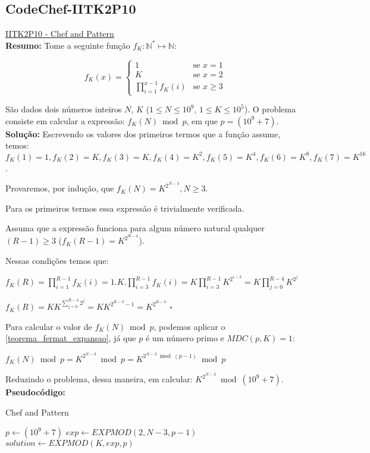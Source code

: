 \subsection{CodeChef-IITK2P10}
\href{https://www.codechef.com/problems/IITK2P10}{IITK2P10 - Chef and Pattern}\\


\textbf{Resumo:}
Tome a seguinte função $f_K:\mathbb{N}^* \longmapsto \mathbb{N}$:

\[
 f_K(x) = 
  \begin{cases} 
   1 & \text{se } x = 1 \\
   K & \text{se } x = 2 \\
   \prod_{i=1}^{x-1}f_K(i) & \text{se } x \geq 3
  \end{cases}
\]

São dados dois números inteiros $N$, $K$ ($1 \leq N \leq 10^9$, $1 \leq K \leq 10^5$). O problema consiste em calcular a expressão: $f_K(N) \bmod p$, em que $p = (10^9+7)$.
\\

\textbf{Solução:}
Escrevendo os valores dos primeiros termos que a função assume, temos: $f_K(1)=1, f_K(2)=K, f_K(3)=K, f_K(4)=K^2, f_K(5)=K^4, f_K(6)=K^8, f_K(7)=K^{16}$.

Provaremos, por indução, que $f_K(N) = K^{2^{N-3}}, N \geq 3$.

Para os primeiros termos essa expressão é trivialmente verificada.

Assuma que a expressão funciona para algum número natural qualquer $(R-1) \geq 3$ ($f_K(R-1) = K^{2^{R-4}}$).

Nessas condições temos que: 

$f_K(R) = \prod_{i=1}^{R-1}f_K(i) = 1.K.\prod_{i=3}^{R-1}f_K(i) = K\prod_{i=3}^{R-1}K^{2^{i-3}} = K\prod_{j=0}^{R-4}K^{2^j}$

$f_K(R) = KK^{\sum_{j=0}^{R-4}2^j} = KK^{2^{R-3}-1} = K^{2^{R-3}}$ $\square$

Para calcular o valor de $f_K(N) \bmod p$, podemos aplicar o \autoref{teorema_fermat_expansao}, já que $p$ é um número primo e $MDC(p, K) = 1$:

$f_K(N) \bmod p = K^{2^{N-3}} \bmod p = K^{2^{N-3} \bmod (p-1)} \bmod p$ 

Reduzindo o problema, dessa maneira, em calcular: $K^{2^{N-3}} \bmod (10^9+7)$.
\\

\textbf{Pseudocódigo:}
\begin{algorithm}
\caption{Chef and Pattern}
\begin{algorithmic}[1]
\State $p \gets (10^9+7)$
\State $exp \gets EXPMOD(2, N-3, p-1)$ 
\State $solution \gets EXPMOD(K, exp, p)$ 
\State {}
\EndProcedure
\end{algorithmic}
\end{algorithm}

